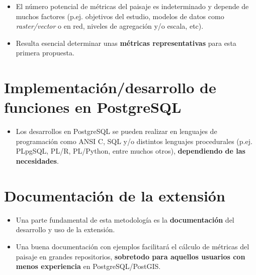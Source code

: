 \begin{graybox}
\begin{itemize}
\item El número potencial de métricas del paisaje es indeterminado y depende de muchos factores (p.ej. objetivos del estudio, modelos de datos como \textit{raster/vector} o en red, niveles de agregación y/o escala, etc).
\item Resulta esencial determinar unas \textbf{métricas representativas} para esta primera propuesta.
\end{itemize}
\end{graybox}


\section{Implementación/desarrollo de funciones en PostgreSQL}

\begin{graybox}
\begin{itemize}
\item Los desarrollos en PostgreSQL se pueden realizar en lenguajes de programación como ANSI C, SQL y/o distintos lenguajes procedurales (p.ej. PLpgSQL, PL/R, PL/Python, entre muchos otros), \textbf{dependiendo de las necesidades}.
\end{itemize}
\end{graybox}



\section{Documentación de la extensión}

\begin{graybox}
\begin{itemize}
\item Una parte fundamental de esta metodología es la \textbf{documentación} del desarrollo y uso de la extensión. 
\item Una buena documentación con ejemplos facilitará el cálculo de métricas del paisaje en grandes repositorios, \textbf{sobretodo para aquellos usuarios con menos experiencia} en PostgreSQL/PostGIS.
\end{itemize}
\end{graybox}

